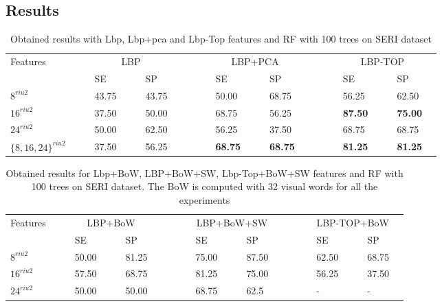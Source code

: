 
\subsection{Results}


\begin{table}
\caption{Obtained results with Lbp, Lbp+pca and Lbp-Top features and RF with 100 trees on SERI dataset}
\centering
\begin{tabular}{lcclcclcccclcclcccclcclc}
\toprule
Features 	& & &\multicolumn{4}{c}{LBP}&	 & & & &\multicolumn{4}{c}{LBP+PCA}& & & & &\multicolumn{4}{c}{LBP-TOP} &\\
  \cmidrule(l){2-8}  \cmidrule(l){10-16}  \cmidrule(l){18-24}
	       & & & SE & & & SP & & & & & SE & & & SP & & & & & SE & & & SP & \\
\midrule
 $8^{riu2}$ 						& & & 43.75 & & & 43.75 & & & & & 50.00 & & & 68.75 & & & & & 56.25 & & & 62.50 & \\	
 $16^{riu2}$						& & & 37.50 & & & 50.00 & & & & & 68.75 & & & 56.25 & & & & & \textbf{87.50} & & & \textbf{75.00} & \\	
 $24^{riu2}$						& & & 50.00 & & & 62.50 & & & & & 56.25 & & & 37.50 & & & & & 68.75 & & & 68.75 & \\
 $\lbrace 8,16,24\rbrace^{riu2}$	& & & 37.50 & & & 56.25 & & & & & \textbf{68.75} & & & \textbf{68.75} & & & & & \textbf{81.25} & & & \textbf{81.25} & \\
\bottomrule
\end{tabular}
\label{tab:LbPTopVolumeResult}
\end{table}



\begin{table}
\caption{Obtained results for Lbp+BoW, LBP+BoW+SW, Lbp-Top+BoW+SW features and RF with 100 trees on SERI dataset. The BoW is computed with 32 visual words for all the experiments}
\centering
\begin{tabular}{lcclcclcccclcclcccclcclc}
\toprule
Features 	& & &\multicolumn{4}{c}{LBP+BoW}&	 & & & &\multicolumn{4}{c}{LBP+BoW+SW}& & & & &\multicolumn{4}{c}{LBP-TOP+BoW} &\\
  \cmidrule(l){2-8}  \cmidrule(l){10-16}  \cmidrule(l){18-24}
	       & & & SE & & & SP & & & & & SE & & & SP & & & & & SE & & & SP & \\
\midrule
 $8^{riu2}$ 						& & & 50.00 & & & 81.25 & & & & & 75.00 & & & 87.50 & & & & & 62.50 & & & 68.75 & \\	
 $16^{riu2}$						& & & 57.50 & & & 68.75 & & & & & 81.25 & & & 75.00 & & & & & 56.25 & & & 37.50 & \\	
 $24^{riu2}$						& & & 50.00 & & & 50.00 & & & & & 68.75 & & & 62.5 & & & & & - & & & - & \\
\bottomrule
\end{tabular}
\label{tab:SERIBoWResult}
\end{table}


